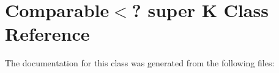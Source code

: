 \hypertarget{class_comparable_3_04_01super_01_k}{}\section{Comparable$<$? super K Class Reference}
\label{class_comparable_3_04_01super_01_k}


The documentation for this class was generated from the following files\+: